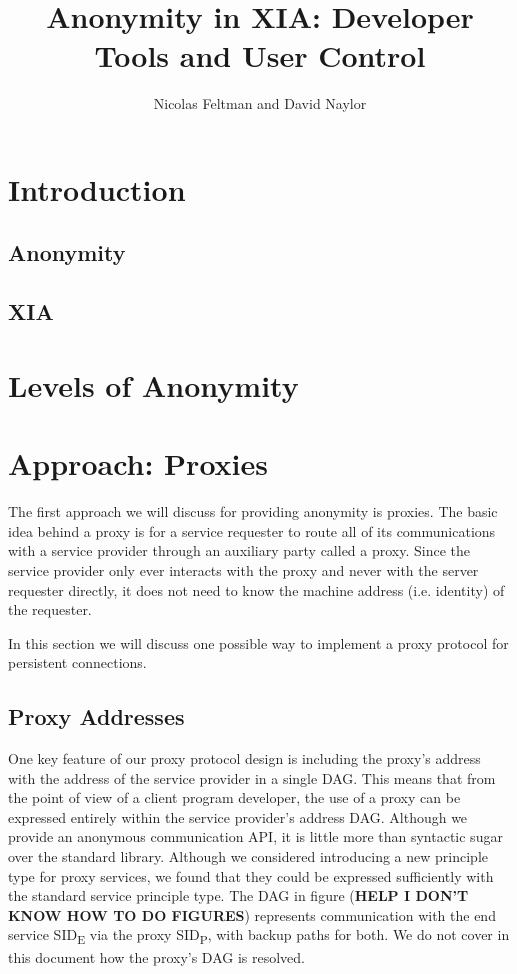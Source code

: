 \documentclass[11pt]{article}
\title{Anonymity in XIA: Developer Tools and User Control}
\author{Nicolas Feltman and David Naylor}
\date{}
\begin{document}
\maketitle
\section{Introduction}
\subsection{Anonymity}
\subsection{XIA}


\section{Levels of Anonymity}


\section{Approach: Proxies}
The first approach we will discuss for providing anonymity is proxies.  The basic idea behind a proxy is for a service requester to route all of its communications with a service provider through an auxiliary party called a proxy.  Since the service provider only ever interacts with the proxy and never with the server requester directly, it does not need to know the machine address (i.e. identity) of the requester.

In this section we will discuss one possible way to implement a proxy protocol for persistent connections.  

\subsection{Proxy Addresses}

One key feature of our proxy protocol design is including the proxy's address with the address of the service provider in a single DAG.  This means that from the point of view of a client program developer, the use of a proxy can be expressed entirely within the service provider's address DAG.  Although we provide an anonymous communication API, it is little more than syntactic sugar over the standard library.  Although we considered introducing a new principle type for proxy services, we found that they could be expressed sufficiently with the standard service principle type.  The DAG in figure ({\bf HELP I DON'T KNOW HOW TO DO FIGURES}) represents communication with the end service SID\textsubscript{E} via the proxy SID\textsubscript{P}, with backup paths for both.  We do not cover in this document how the proxy's DAG is resolved.
\end{document}
